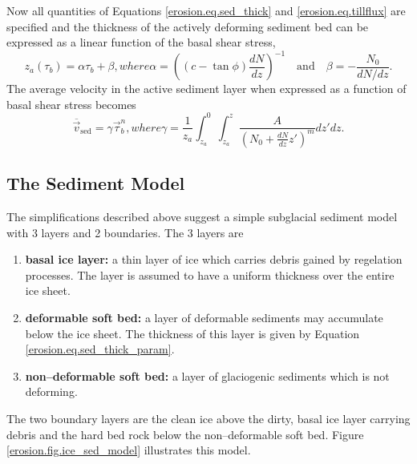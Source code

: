 Now all quantities of Equations \eqref{erosion.eq.sed_thick} and \eqref{erosion.eq.tillflux} are specified and the thickness of the actively deforming sediment bed can be expressed as a linear function of the basal shear stress,
\begin{subequations}
  \begin{equation}
    \label{erosion.eq.sed_thick_param}
    z_a(\tau_b)=\alpha\tau_b+\beta,
  \end{equation}
  where
  \begin{equation}
    \alpha=\left({(c-\tan\phi)\frac{dN}{dz}}\right)^{-1}\quad\text{and}\quad\beta=-\frac{N_0}{dN/dz}.
  \end{equation}
\end{subequations}
The average velocity in the active sediment layer when expressed as a function of basal shear stress becomes
\begin{subequations}
  \begin{equation}
    \label{erosion.eq.sed_trans_param}
    \overline{\vec{v}}_{\text{sed}}=\gamma\vec\tau_b^n,
  \end{equation}
  where
  \begin{equation}
    \gamma=\frac1{z_a}\int_{z_a}^0\int_{z_a}^{z}\frac{A}{\left(N_0+\frac{dN}{dz}z'\right)^m}dz'dz.
  \end{equation}
\end{subequations}

\subsection{The Sediment Model}
The simplifications described above suggest a simple subglacial sediment model with 3 layers and 2 boundaries. The 3 layers are
\begin{enumerate}
\item \textbf{basal ice layer:} a thin layer of ice which carries debris gained
by regelation processes. The layer is assumed to have a uniform thickness over the entire ice sheet.
\item \textbf{deformable soft bed:} a layer of deformable sediments may accumulate below the ice sheet. The thickness of this layer is given by Equation \eqref{erosion.eq.sed_thick_param}.
\item \textbf{non--deformable soft bed:} a layer of glaciogenic sediments which is not deforming.
\end{enumerate}
The two boundary layers are the clean ice above the dirty, basal ice layer carrying debris and the hard bed rock below the non--deformable soft bed. Figure \ref{erosion.fig.ice_sed_model} illustrates this model.

